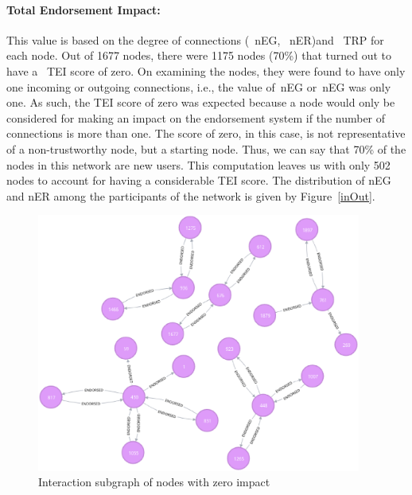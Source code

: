 \paragraph{Total Endorsement Impact:} \label{par:TEI}This value is based on the
degree of connections (~\ac{nEG}, ~\ac{nER})and ~\ac{TRP} for each node. Out of
1677 nodes, there were 1175 nodes (70\%) that turned out to have a ~\ac{TEI}
score of zero. On examining the nodes, they were found to have only one
incoming or outgoing connections, i.e., the value of~\ac{nEG} or~\ac{nEG} was
only one. As such, the \ac{TEI} score of zero was expected because a node would
only be considered for making an impact on the endorsement system if the number
of connections is more than one. The score of zero, in this case, is not
representative of a non-trustworthy node, but a starting node. Thus, we can say
that 70\% of the nodes in this network are new users. This computation leaves
us with only 502 nodes to account for having a considerable \ac{TEI} score. The
distribution of \ac{nEG} and \ac{nER} among the participants of the network is
given by Figure~\ref{inOut}.
\begin{figure}[H]
	\includegraphics[width=0.95\textwidth]{Images/nodesWithImpactZero.eps}
	\caption{Interaction subgraph of nodes with zero impact}
	\label{fig:zeroimpact}
\end{figure}
